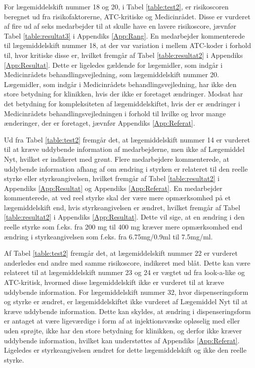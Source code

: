 For lægemiddelskift nummer 18 og 20, i Tabel \ref{table:test2}, er risikoscoren beregnet ud fra risikofaktorerne, ATC-kritiske og Medicinrådet. Disse er vurderet af fire ud af seks medarbejder til at skulle have en lavere risikoscore, jævnfør Tabel \ref{table:resultat3} i Appendiks \ref{App:Rang}. En medarbejder kommenterede til lægemiddelskift nummer 18, at der var variation
i mellem ATC-koder i forhold til, hvor kritiske disse er, hvilket fremgår af Tabel \ref{table:resultat2} i Appendiks \ref{App:Resultat}. Dette er ligeledes gældende for lægemidler, som indgår i Medicinrådets behandlingsvejledning, som lægemiddelskift nummer 20. Lægemidler, som indgår i Medicinrådets behandlingsvejledning, har ikke den store betydning for klinikken, hvis der ikke er foretaget ændringer. Modsat har det betydning for kompleksiteten af lægemiddelskiftet, hvis der er ændringer i Medicinrådets behandlingsvejledningen i forhold til hvilke og hvor mange ænderinger, der er foretaget, jævnfør Appendiks \ref{App:Referat}.

Ud fra Tabel \ref{table:test2} fremgår det, at lægemiddelskift nummer 14 er vurderet til at kræve uddybende information af medarbejderne, men ikke af Lægemiddel Nyt, hvilket er indikeret med grønt. Flere medarbejdere kommenterede, at uddybende information afhang af om ændring i styrken er relateret til den reelle styrke eller styrkeangivelsen, hvilket fremgår af Tabel \ref{table:resultat2} i Appendiks \ref{App:Resultat} og Appendiks \ref{App:Referat}. En medarbejder kommenterede, at ved reel styrke skal der være mere opmærksomhed på et lægemiddelskift end, hvis styrkeangivelsen er ændret, hvilket fremgår af Tabel \ref{table:resultat2} i Appendiks \ref{App:Resultat}. Dette vil sige, at en ændring i den reelle styrke som f.eks. fra 200 mg til 400 mg kræver mere opmærksomhed end ændring i styrkeangivelsen som f.eks. fra 6.75mg/0.9ml til 7.5mg/ml.

Af Tabel \ref{table:test2} fremgår det, at lægemiddelskift nummer 22 er vurderet anderledes end andre med samme risikoscore, indikeret med blåt. Dette kan være relateret til at lægemiddelskift nummer 23 og 24 er vægtet ud fra look-a-like og ATC-kritisk, hvormed disse lægemiddelskift ikke er vurderet til at kræve uddybende information. For lægemiddelskift nummer 32, hvor dispenseringsform og styrke er ændret, er lægemiddelskiftet ikke vurderet af Lægemiddel Nyt til at kræve uddybende information. Dette kan skyldes, at ændring i dispenseringsform er antaget at være ligeværdige i form af at injektionsvæske opløselig med eller uden sprøjte, ikke har den store betydning for klinikken, og derfor ikke kræver uddybende information, hvilket kan understøttes af Appendiks \ref{App:Referat}.
Ligeledes er styrkeangivelsen ændret for dette lægemiddelskift og ikke den reelle styrke. 

